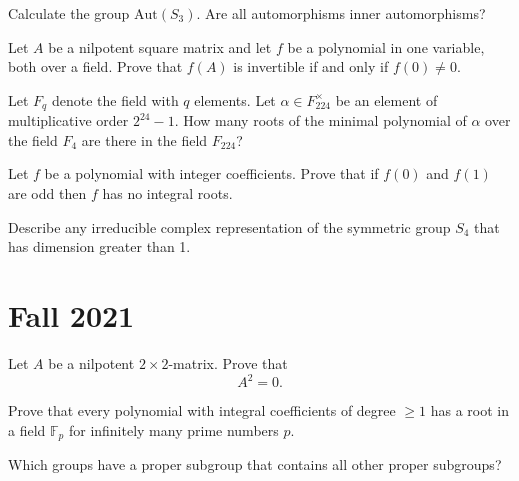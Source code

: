 \documentclass[openany]{book}
\begin{document}
\begin{prob}
    Calculate the group \(\text{Aut}(S_3)\). Are all automorphisms inner automorphisms?
\end{prob}



\begin{prob}
    Let \(A\) be a nilpotent square matrix and let \(f\) be a polynomial in one variable, both over a field. Prove that \(f(A)\) is invertible if and only if \(f(0) \neq 0\).
\end{prob}



\begin{prob}
    Let \(F_q\) denote the field with \(q\) elements. Let \(\alpha \in F_{224}^\times\) be an element of multiplicative order \(2^{24} - 1\). How many roots of the minimal polynomial of \(\alpha\) over the field \(F_4\) are there in the field \(F_{224}\)?
\end{prob}



\begin{prob}
    Let \(f\) be a polynomial with integer coefficients. Prove that if \(f(0)\) and \(f(1)\) are odd then \(f\) has no integral roots.
\end{prob}



\begin{prob}
    Describe any irreducible complex representation of the symmetric group \(S_4\) that has dimension greater than 1.
\end{prob}




\chapter{Fall 2021}



\begin{prob}
    Let \(A\) be a nilpotent \(2 \times 2\)-matrix. Prove that 
    \[A^2 = 0.\]
\end{prob}


\begin{prob}
    Prove that every polynomial with integral coefficients of degree \(\geq 1\) has a root in a field \(\mathbb{F}_p\) for infinitely many prime numbers \(p\).
\end{prob}


\begin{prob}
    Which groups have a proper subgroup that contains all other proper subgroups?
\end{prob}
\end{document}
